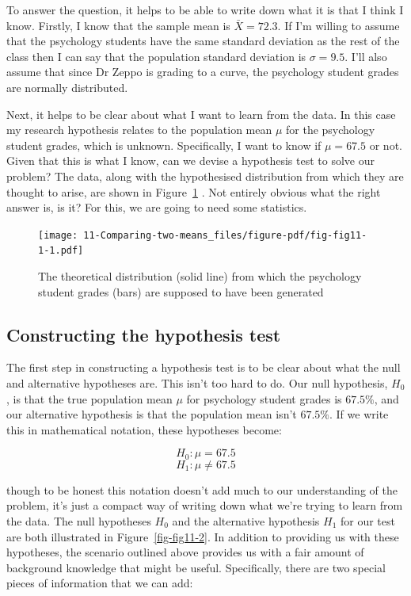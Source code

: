 \documentclass[
  a4paper,
]{book}
\begin{document}
To answer the question, it helps to be able to write down what it is
that I think I know. Firstly, I know that the sample mean is
\(\bar{X} = 72.3\). If I'm willing to assume that the psychology
students have the same standard deviation as the rest of the class then
I can say that the population standard deviation is \(\sigma = 9.5\).
I'll also assume that since Dr Zeppo is grading to a curve, the
psychology student grades are normally distributed.

Next, it helps to be clear about what I want to learn from the data. In
this case my research hypothesis relates to the population mean \(\mu\)
for the psychology student grades, which is unknown. Specifically, I
want to know if \(\mu = 67.5\) or not. Given that this is what I know,
can we devise a hypothesis test to solve our problem? The data, along
with the hypothesised distribution from which they are thought to arise,
are shown in Figure~\ref{fig-fig11-1} . Not entirely obvious what the
right answer is, is it? For this, we are going to need some statistics.

\begin{figure}

\texttt{[image: 11-Comparing-two-means\_files/figure-pdf/fig-fig11-1-1.pdf]} \hfill{}

\caption{\label{fig-fig11-1}The theoretical distribution (solid line)
from which the psychology student grades (bars) are supposed to have
been generated}

\end{figure}

\hypertarget{constructing-the-hypothesis-test}{%
\subsection{Constructing the hypothesis
test}\label{constructing-the-hypothesis-test}}

The first step in constructing a hypothesis test is to be clear about
what the null and alternative hypotheses are. This isn't too hard to do.
Our null hypothesis, \(H_0\), is that the true population mean \(\mu\)
for psychology student grades is \(67.5\%\), and our alternative
hypothesis is that the population mean isn't \(67.5\%\). If we write
this in mathematical notation, these hypotheses become:

\[ H_0:\mu= 67.5 \] \[ H_1:\mu \neq 67.5 \]

though to be honest this notation doesn't add much to our understanding
of the problem, it's just a compact way of writing down what we're
trying to learn from the data. The null hypotheses \(H_0\) and the
alternative hypothesis \(H_1\) for our test are both illustrated in
Figure~\ref{fig-fig11-2}. In addition to providing us with these
hypotheses, the scenario outlined above provides us with a fair amount
of background knowledge that might be useful. Specifically, there are
two special pieces of information that we can add:
\end{document}
